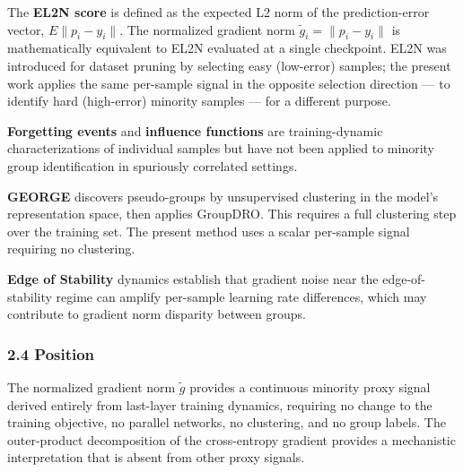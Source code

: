 The \textbf{EL2N score} \citep{Paul2021} is defined as the expected L2 norm of the prediction-error vector, $E\|p_i - y_{i}\|$. The normalized gradient norm $\tilde{g}_i = \|p_i - y_{i}\|$ is mathematically equivalent to EL2N evaluated at a single checkpoint. EL2N was introduced for dataset pruning by selecting easy (low-error) samples; the present work applies the same per-sample signal in the opposite selection direction --- to identify hard (high-error) minority samples --- for a different purpose.

\textbf{Forgetting events} \citep{Toneva2019} and \textbf{influence functions} \citep{Koh2017} are training-dynamic characterizations of individual samples but have not been applied to minority group identification in spuriously correlated settings.

\textbf{GEORGE} \citep{Zhang2022GEORGE} discovers pseudo-groups by unsupervised clustering in the model's representation space, then applies GroupDRO. This requires a full clustering step over the training set. The present method uses a scalar per-sample signal requiring no clustering.

\textbf{Edge of Stability} dynamics \citep{Cohen2021Gradient} establish that gradient noise near the edge-of-stability regime can amplify per-sample learning rate differences, which may contribute to gradient norm disparity between groups.

\subsubsection{2.4 Position}

The normalized gradient norm $\tilde{g}$ provides a continuous minority proxy signal derived entirely from last-layer training dynamics, requiring no change to the training objective, no parallel networks, no clustering, and no group labels. The outer-product decomposition of the cross-entropy gradient provides a mechanistic interpretation that is absent from other proxy signals.

